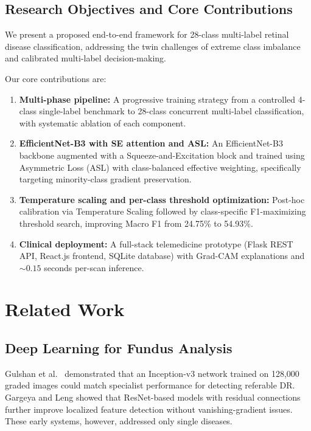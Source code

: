 \documentclass[conference]{IEEEtran}
\begin{document}
\subsection{Research Objectives and Core Contributions}
We present a proposed end-to-end framework for 28-class multi-label retinal disease classification, addressing the twin challenges of extreme class imbalance and calibrated multi-label decision-making.

Our core contributions are:
\begin{enumerate}
    \item \textbf{Multi-phase pipeline:} A progressive training strategy from a controlled 4-class single-label benchmark to 28-class concurrent multi-label classification, with systematic ablation of each component.
    \item \textbf{EfficientNet-B3 with SE attention and ASL:} An EfficientNet-B3 backbone augmented with a Squeeze-and-Excitation block and trained using Asymmetric Loss (ASL) \cite{ben2020asymmetric} with class-balanced effective weighting, specifically targeting minority-class gradient preservation.
    \item \textbf{Temperature scaling and per-class threshold optimization:} Post-hoc calibration via Temperature Scaling \cite{guo2017calibration} followed by class-specific F1-maximizing threshold search, improving Macro F1 from 24.75\% to 54.93\%.
    \item \textbf{Clinical deployment:} A full-stack telemedicine prototype (Flask REST API, React.js frontend, SQLite database) with Grad-CAM \cite{selvaraju2017grad} explanations and ${\sim}0.15$ seconds per-scan inference.
\end{enumerate}


\section{Related Work}

\subsection{Deep Learning for Fundus Analysis}
Gulshan et al.\ \cite{gulshan2016development} demonstrated that an Inception-v3 network trained on 128,000 graded images could match specialist performance for detecting referable DR. Gargeya and Leng \cite{gargeya2017automated} showed that ResNet-based models with residual connections further improve localized feature detection without vanishing-gradient issues. These early systems, however, addressed only single diseases.
\end{document}

